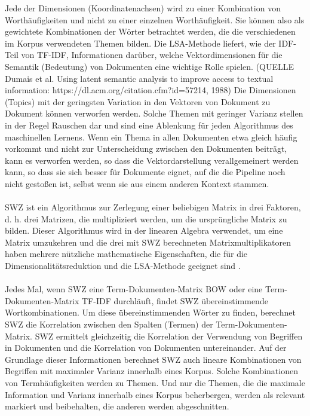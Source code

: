 Jede der Dimensionen (Koordinatenachsen) wird zu einer Kombination von Worthäufigkeiten und nicht zu einer einzelnen Worthäufigkeit. 
Sie können also als gewichtete Kombinationen der Wörter betrachtet werden, die die verschiedenen im Korpus verwendeten Themen bilden.  
Die \ac{LSA}-Methode liefert, wie der \ac{IDF}-Teil von \ac{TF-IDF}, Informationen darüber, welche Vektordimensionen für die Semantik (Bedeutung) von Dokumenten eine wichtige Rolle spielen. (QUELLE Dumais et al. Using latent semantic analysis to improve access to textual information: https://dl.acm.org/citation.cfm?id=57214, 1988)
Die Dimensionen (Topics) mit der geringsten Variation in den Vektoren von Dokument zu Dokument können verworfen werden. 
Solche Themen mit geringer Varianz stellen in der Regel Rauschen dar und sind eine Ablenkung für jeden Algorithmus des maschinellen Lernens. 
Wenn ein Thema in allen Dokumenten etwa gleich häufig vorkommt und nicht zur Unterscheidung zwischen den Dokumenten beiträgt, kann es verworfen werden, so dass die Vektordarstellung verallgemeinert werden kann, so dass sie sich besser für Dokumente eignet, auf die die Pipeline noch nicht gestoßen ist, selbst wenn sie aus einem anderen Kontext stammen.\\\\
\ac{SWZ} ist ein Algorithmus zur Zerlegung einer beliebigen Matrix in drei Faktoren, d. h. drei Matrizen, die multipliziert werden, um die ursprüngliche Matrix zu bilden. 
Dieser Algorithmus wird in der linearen Algebra verwendet, um eine Matrix umzukehren und die drei mit \ac{SWZ} berechneten Matrixmultiplikatoren haben mehrere nützliche mathematische Eigenschaften, die für die Dimensionalitätsreduktion und die \ac{LSA}-Methode geeignet sind \cite{eckart_approximation_1936}.\\\\
Jedes Mal, wenn \ac{SWZ} eine Term-Dokumenten-Matrix \ac{BOW} oder eine Term-Dokumenten-Matrix \ac{TF-IDF} durchläuft, findet \ac{SWZ} übereinstimmende Wortkombinationen. 
Um diese übereinstimmenden Wörter zu finden, berechnet \ac{SWZ} die Korrelation zwischen den Spalten (Termen) der Term-Dokumenten-Matrix. 
\ac{SWZ} ermittelt gleichzeitig die Korrelation der Verwendung von Begriffen in Dokumenten und die Korrelation von Dokumenten untereinander. 
Auf der Grundlage dieser Informationen berechnet \ac{SWZ} auch lineare Kombinationen von Begriffen mit maximaler Varianz innerhalb eines Korpus. 
Solche Kombinationen von Termhäufigkeiten werden zu Themen. 
Und nur die Themen, die die maximale Information und Varianz innerhalb eines Korpus beherbergen, werden als relevant markiert und beibehalten, die anderen werden abgeschnitten. 
